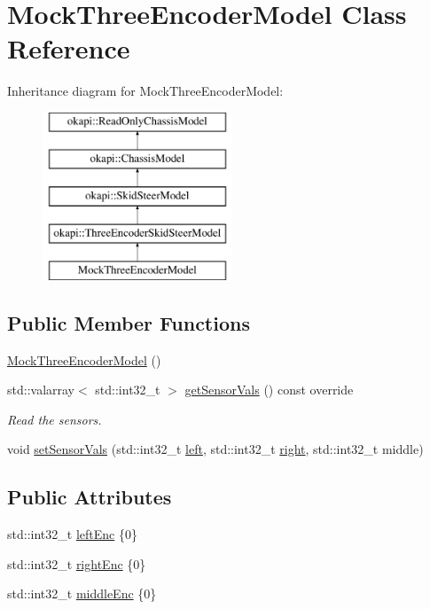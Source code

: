 \hypertarget{classMockThreeEncoderModel}{}\section{Mock\+Three\+Encoder\+Model Class Reference}
\label{classMockThreeEncoderModel}
Inheritance diagram for Mock\+Three\+Encoder\+Model\+:\begin{figure}[H]
\begin{center}
\leavevmode
\includegraphics[height=5.000000cm]{classMockThreeEncoderModel}
\end{center}
\end{figure}
\subsection*{Public Member Functions}
\begin{DoxyCompactItemize}
\item 
\mbox{\hyperlink{classMockThreeEncoderModel_aeb3abc5679f106eb7ec8cab93ac9a0d6}{Mock\+Three\+Encoder\+Model}} ()
\item 
std\+::valarray$<$ std\+::int32\+\_\+t $>$ \mbox{\hyperlink{classMockThreeEncoderModel_abfb68ba00f387d3374c979eb4b136e33}{get\+Sensor\+Vals}} () const override
\begin{DoxyCompactList}\small\item\em Read the sensors. \end{DoxyCompactList}\item 
void \mbox{\hyperlink{classMockThreeEncoderModel_a645e8b959fca1501920224882ed3e458}{set\+Sensor\+Vals}} (std\+::int32\+\_\+t \mbox{\hyperlink{classokapi_1_1SkidSteerModel_af2b00108853b82eb0fb5ecb3b71f413d}{left}}, std\+::int32\+\_\+t \mbox{\hyperlink{classokapi_1_1SkidSteerModel_ada9bd222b5aeaa0507b57906ac59dd3b}{right}}, std\+::int32\+\_\+t middle)
\end{DoxyCompactItemize}
\subsection*{Public Attributes}
\begin{DoxyCompactItemize}
\item 
std\+::int32\+\_\+t \mbox{\hyperlink{classMockThreeEncoderModel_aba80c6ce08e472a9d1eb1f51000ba790}{left\+Enc}} \{0\}
\item 
std\+::int32\+\_\+t \mbox{\hyperlink{classMockThreeEncoderModel_ab2c750607e68aed5a19571dec3564163}{right\+Enc}} \{0\}
\item 
std\+::int32\+\_\+t \mbox{\hyperlink{classMockThreeEncoderModel_aecf199207e0dc4648047593271e6a2dd}{middle\+Enc}} \{0\}
\end{DoxyCompactItemize}

